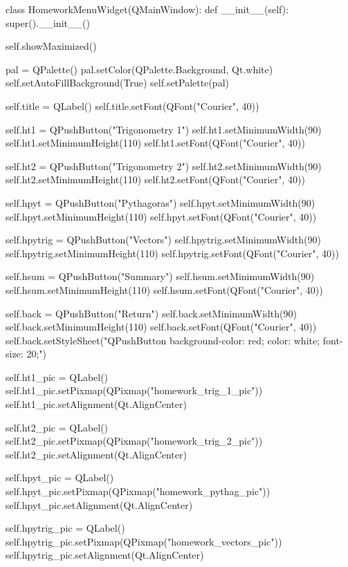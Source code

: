 \begin{python}
class HomeworkMenuWidget(QMainWindow):
    def __init__(self):
        super().__init__()

        self.showMaximized()

        pal = QPalette()
        pal.setColor(QPalette.Background, Qt.white)
        self.setAutoFillBackground(True)
        self.setPalette(pal)

        self.title = QLabel()
        self.title.setFont(QFont("Courier", 40))

        self.ht1 = QPushButton("Trigonometry 1")
        self.ht1.setMinimumWidth(90)
        self.ht1.setMinimumHeight(110)
        self.ht1.setFont(QFont("Courier", 40))
        
        self.ht2 = QPushButton("Trigonometry 2")
        self.ht2.setMinimumWidth(90)
        self.ht2.setMinimumHeight(110)
        self.ht2.setFont(QFont("Courier", 40))
        
        self.hpyt = QPushButton("Pythagoras")
        self.hpyt.setMinimumWidth(90)
        self.hpyt.setMinimumHeight(110)
        self.hpyt.setFont(QFont("Courier", 40))
        
        self.hpytrig = QPushButton("Vectors")
        self.hpytrig.setMinimumWidth(90)
        self.hpytrig.setMinimumHeight(110)
        self.hpytrig.setFont(QFont("Courier", 40))
        
        self.hsum = QPushButton("Summary")
        self.hsum.setMinimumWidth(90)
        self.hsum.setMinimumHeight(110)
        self.hsum.setFont(QFont("Courier", 40))
        
        self.back = QPushButton("Return")
        self.back.setMinimumWidth(90)
        self.back.setMinimumHeight(110)
        self.back.setFont(QFont("Courier", 40))
        self.back.setStyleSheet("QPushButton {background-color: red; color: white; font-size: 20;}")

        self.ht1_pic = QLabel()
        self.ht1_pic.setPixmap(QPixmap("homework_trig_1_pic"))
        self.ht1_pic.setAlignment(Qt.AlignCenter)
        
        self.ht2_pic = QLabel()
        self.ht2_pic.setPixmap(QPixmap("homework_trig_2_pic"))
        self.ht2_pic.setAlignment(Qt.AlignCenter)
        
        self.hpyt_pic = QLabel()
        self.hpyt_pic.setPixmap(QPixmap("homework_pythag_pic"))
        self.hpyt_pic.setAlignment(Qt.AlignCenter)
        
        self.hpytrig_pic = QLabel()
        self.hpytrig_pic.setPixmap(QPixmap("homework_vectors_pic"))
        self.hpytrig_pic.setAlignment(Qt.AlignCenter)
        

\end{python}
